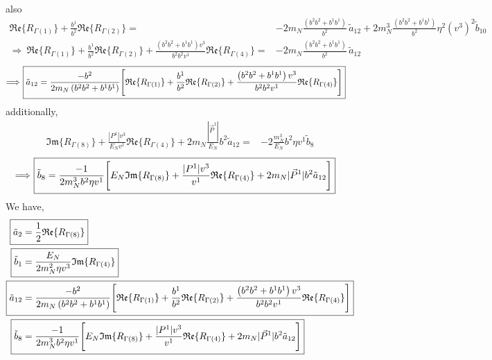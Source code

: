 \documentclass[]{article}
\numberwithin{equation}{section}
\newcommand{\bvec}{b}
\newcommand{\mN}{m_N}
\begin{document}
also
\begin{align}
    \mathfrak{Re}\{ R_{\Gamma(1)}\} +\frac{b^1}{b^2}\mathfrak{Re}\{ R_{\Gamma(2)}\} =&-2\mN  \frac{\left(\bvec^2\bvec^2 +\bvec^1\bvec^1\right)}{\bvec^2}\, \tilde a_{12}+  2\mN^3  \frac{\left(\bvec^2\bvec^2 +\bvec^1\bvec^1\right)}{\bvec^2} \eta^2 (v^3)^2 \tilde b_{10}\nonumber\\
    \Longrightarrow~\mathfrak{Re}\{ R_{\Gamma(1)}\} +\frac{b^1}{b^2}\mathfrak{Re}\{ R_{\Gamma(2)}\}+\frac{\left(\bvec^2\bvec^2 +\bvec^1\bvec^1\right)v^3}{\bvec^2\bvec^2v^1}\mathfrak{Re}\{ R_{\Gamma(4)}\} =&-2\mN  \frac{\left(\bvec^2\bvec^2 +\bvec^1\bvec^1\right)}{\bvec^2}\, \tilde a_{12}
\end{align}
\begin{align}
    \Longrightarrow~\Aboxed{\tilde a_{12} =& \frac{-\bvec^2}{2\mN \left(\bvec^2\bvec^2 +\bvec^1\bvec^1\right)}\Bigg[\mathfrak{Re}\{ R_{\Gamma(1)}\} +\frac{b^1}{b^2}\mathfrak{Re}\{ R_{\Gamma(2)}\}+\frac{\left(\bvec^2\bvec^2 +\bvec^1\bvec^1\right)v^3}{\bvec^2\bvec^2v^1}\mathfrak{Re}\{ R_{\Gamma(4)}\}\Bigg]}
\end{align}
additionally,
\begin{align}
    \mathfrak{Im}\{ R_{\Gamma(8)}\}+\frac{|P^1|v^3}{E_N v^1}\mathfrak{Re}\{ R_{\Gamma(4)}\}+2\mN  \frac{|\vec{P}^1|}{E_N} \bvec^2  \tilde a_{12}=& - 2\frac{  \mN^3}{E_N}  \bvec^2 \eta v^1  \tilde b_8
\end{align}
\begin{align}
    \Longrightarrow~\Aboxed{\tilde b_8 =& \frac{-1}{ 2\mN^3  \bvec^2 \eta v^1} \Bigg[ E_N \mathfrak{Im}\{ R_{\Gamma(8)}\}+\frac{|P^1|v^3}{ v^1}\mathfrak{Re}\{ R_{\Gamma(4)}\}+2\mN  |\vec{P}^1|\bvec^2  \tilde a_{12}\Bigg]}
\end{align}
We have,
\begin{align}
    \Aboxed{\tilde a_2 = & \frac{1}{2}\mathfrak{Re}\{ R_{\Gamma(8)}\} }\\
    \Aboxed{\tilde b_1 = & \frac{E_{N}}{2\mN^2 \eta v^3} \mathfrak{Im}\{ R_{\Gamma(4)}\}}\\
    \Aboxed{\tilde a_{12} =& \frac{-\bvec^2}{2\mN \left(\bvec^2\bvec^2 +\bvec^1\bvec^1\right)}\Bigg[\mathfrak{Re}\{ R_{\Gamma(1)}\} +\frac{b^1}{b^2}\mathfrak{Re}\{ R_{\Gamma(2)}\}+\frac{\left(\bvec^2\bvec^2 +\bvec^1\bvec^1\right)v^3}{\bvec^2\bvec^2v^1}\mathfrak{Re}\{ R_{\Gamma(4)}\}\Bigg]}\\
    \Aboxed{\tilde b_8 =& \frac{-1}{ 2\mN^3  \bvec^2 \eta v^1} \Bigg[ E_N \mathfrak{Im}\{ R_{\Gamma(8)}\}+\frac{|P^1|v^3}{ v^1}\mathfrak{Re}\{ R_{\Gamma(4)}\}+2\mN  |\vec{P}^1|\bvec^2  \tilde a_{12}\Bigg]}
\end{align}
\end{document}
